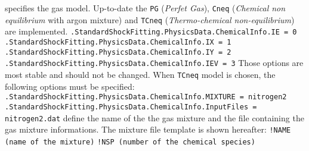 \documentclass[11pt,a4paper,oneside]{article}
\begin{document}
\newline
\newline
specifies the gas model. Up-to-date the \texttt{PG} (\textit{Perfet Gas}), \texttt{Cneq} (\textit{Chemical non equilibrium} with argon mixture) and \texttt{TCneq} (\textit{Thermo-chemical non-equilibrium}) are implemented.
\newline
\newline
\newline
\newline
\hspace*{1cm} \texttt{.StandardShockFitting.PhysicsData.ChemicalInfo.IE = 0}
\newline
\hspace*{1cm} \texttt{.StandardShockFitting.PhysicsData.ChemicalInfo.IX = 1}
\newline
\hspace*{1cm} \texttt{.StandardShockFitting.PhysicsData.ChemicalInfo.IY = 2}
\newline
\hspace*{1cm} \texttt{.StandardShockFitting.PhysicsData.ChemicalInfo.IEV = 3}
\newline
\newline
Those options are most stable and should not be changed.
\newline
When \texttt{TCneq} model is chosen, the following options must be specified:
\newline
\newline
\hspace*{1cm} \texttt{.StandardShockFitting.PhysicsData.ChemicalInfo.MIXTURE = nitrogen2}
\newline
\hspace*{1cm} \texttt{.StandardShockFitting.PhysicsData.ChemicalInfo.InputFiles = nitrogen2.dat}
\newline
\newline
define the name of the the gas mixture and the file containing the gas mixture informations.
\newline
The mixture file template is shown hereafter:
\newline
\newline
\hspace*{1.2cm}
\texttt{!NAME \hspace*{2cm} (name of the mixture)}
\newline
\hspace*{1.2cm}
\texttt{!NSP \hspace*{2.2cm} (number of the chemical species)}
\newline
\end{document}
